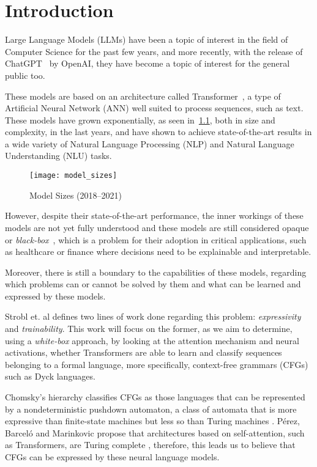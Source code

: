 \chapter{Introduction}

Large Language Models (LLMs) have been a topic of interest in the field of Computer Science for the past few years, 
and more recently, with the release of ChatGPT~\cite{chatgpt} by OpenAI, they have become a topic of interest for the general public too. 

These models are based on an architecture called Transformer~\cite{attention_is_all_you_need}, a type of Artificial Neural Network (ANN) 
well suited to process sequences, such as text. These models have grown exponentially, as seen in~\ref{fig:model_sizes}, both in size and complexity, in the last years, and 
have shown to achieve state-of-the-art results in a wide variety of Natural Language Processing (NLP) and Natural Language Understanding (NLU) tasks.

\begin{figure}[H]
    \centering
    \texttt{[image: model\_sizes]}
    \caption{Model Sizes (2018--2021)~\cite{model_sizes}}
    \label{fig:model_sizes}
\end{figure}

However, despite their state-of-the-art performance, the inner workings of these models are not yet fully understood and these models are still considered opaque or \emph{black-box}~\cite{lei-etal-2016-rationalizing}, which is a problem for their adoption in critical applications, such as healthcare or finance where decisions need to be explainable and interpretable. 

Moreover, there is still a boundary to the capabilities of these models, regarding which problems can or cannot be solved by them and what can be learned and expressed by these models.

Strobl et. al \cite{strobl2024formal} defines two lines of work done regarding this problem: \textit{expressivity} and \textit{trainability}. This work will focus on the former, as we aim to determine, using a \textit{white-box} approach, by looking at the attention mechanism and neural activations, whether Transformers are able to learn and classify sequences belonging to a formal language, more specifically, context-free grammars (CFGs) such as Dyck languages.

Chomsky's hierarchy \cite{chomsky-hierarchy} classifies CFGs as those languages that can be represented by a nondeterministic pushdown automaton, a class of automata that is more expressive than finite-state machines but less so than Turing machines \cite{context-free-chomsky}. Pérez, Barceló and Marinkovic propose that architectures based on self-attention, such as Transformers, are Turing complete \cite{attention-tc}, therefore, this leads us to believe that CFGs can be expressed by these neural language models.

